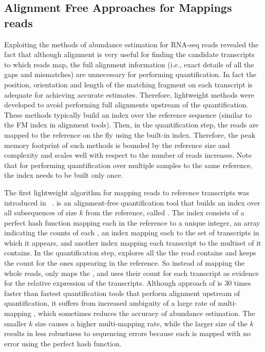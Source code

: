 \subsection{Alignment Free Approaches for Mappings reads}\label{int:qm}
Exploiting the methods of abundance estimation for RNA-seq reads revealed the 
fact that although alignment is very useful for finding the candidate transcripts 
to which reads map, the full alignment information (i.e., exact details of all the 
gaps and mismatches) are unnecessary for performing quantification. In fact the 
position, orientation and length of the matching fragment on each transcript is 
adequate for achieving accurate estimates. Therefore, lightweight methods were 
developed to avoid performing full alignments upstream of the quantification. 
These methods typically build an index over the reference sequence (similar to 
the FM index in alignment tools). Then, in the quantification step, the reads 
are mapped to the reference on the fly using the built-in index. 
Therefore, the peak memory footprint of such methods is bounded by the reference 
size and complexity and scales well with respect to the number of reads increases. Note that 
for performing quantification over multiple samples to the same reference, the 
index needs to be built only once.

The first lightweight algorithm for mapping reads to reference transcripts was 
introduced in \sailfish~\citep{Patro2014Sailfish}. \sailfish is an alignment-free 
quantification tool that builds an index over all subsequences of size $k$ from the 
reference, called \kmers. The \sailfish index consists of a perfect hash function 
mapping each \kmer in the reference to a unique integer, an array indicating the 
counts of each \kmer, an index mapping each \kmer to the set of transcripts 
in which it appears, and another index mapping each transcript to the multiset 
of \kmers it contains. In the quantification step, \sailfish explores all the 
\kmers the read contains and keeps the count for the ones appearing in the 
reference. So instead of mapping the whole reads, \sailfish only maps the \kmers, 
and uses their count for each transcript as evidence for the relative expression 
of the transcripts. Although approach of \sailfish is 30 times faster than fastest 
quantification tools that perform alignment upstream of quantification, 
it suffers from increased ambiguity of a large rate of multi-mapping \kmers, 
which sometimes reduces the accuracy of abundance estimation. The smaller $k$ size 
causes a higher multi-mapping rate, while the larger size of the $k$ results in 
less robustness to sequencing errors because each \kmer is mapped with no error 
using the perfect hash function.

